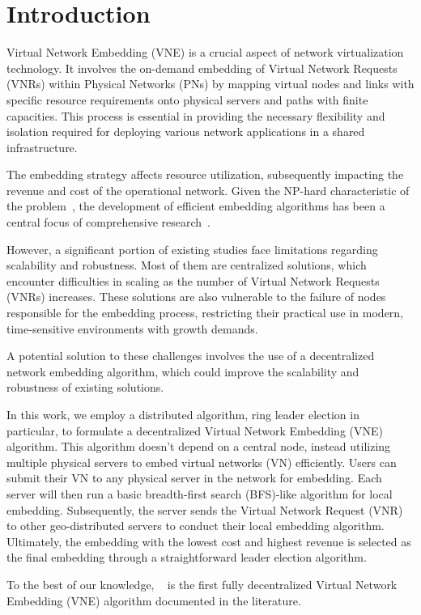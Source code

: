 \section{Introduction}
Virtual Network Embedding (VNE) is a crucial aspect of network virtualization technology. It involves the on-demand embedding of Virtual Network Requests (VNRs) within Physical Networks (PNs) by mapping virtual nodes and links with specific resource requirements onto physical servers and paths with finite capacities.
%
This process is essential in providing the necessary flexibility and isolation required for deploying various network applications in a shared infrastructure. 


The embedding strategy affects resource utilization, subsequently impacting the revenue and cost of the operational network. Given the NP-hard characteristic of the problem~\cite{vne_nphard}, the development of efficient embedding algorithms has been a central focus of comprehensive research~\cite{survey_1}.

However, a significant portion of existing studies face limitations regarding scalability and robustness. Most of them are centralized solutions, which encounter difficulties in scaling as the number of Virtual Network Requests (VNRs) increases. These solutions are also vulnerable to the failure of nodes responsible for the embedding process, restricting their practical use in modern, time-sensitive environments with growth demands.

A potential solution to these challenges involves the use of a decentralized network embedding algorithm, which could improve the scalability and robustness of existing solutions.


In this work, we employ a distributed algorithm, ring leader election in particular, to formulate a decentralized Virtual Network Embedding (VNE) algorithm.  This algorithm doesn't depend on a central node, instead utilizing multiple physical servers to embed virtual networks (VN) efficiently. Users can submit their VN to any physical server in the network for embedding. Each server will then run a basic breadth-first search (BFS)-like algorithm for local embedding. Subsequently, the server sends the Virtual Network Request (VNR) to other geo-distributed servers to conduct their local embedding algorithm. Ultimately, the embedding with the lowest cost and highest revenue is selected as the final embedding through a straightforward leader election algorithm.


To the best of our knowledge, \ourAlg~ is the first fully decentralized Virtual Network Embedding (VNE) algorithm documented in the literature.